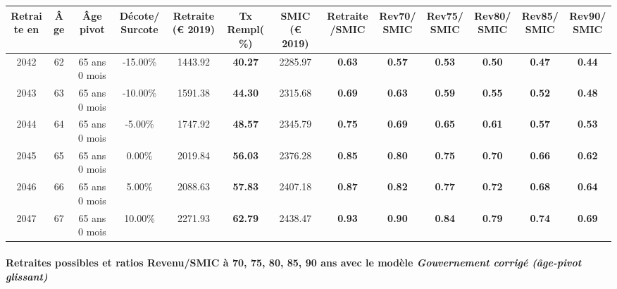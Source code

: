 { \scriptsize \begin{center} 
\begin{tabular}[htb]{|c|c||c|c||c|c||c||c|c|c|c|c|c|} 
\hline 
 Retraite en &  Âge &  Âge pivot &  Décote/Surcote &  Retraite (\euro{} 2019) &  Tx Rempl(\%) &  SMIC (\euro{} 2019) &  Retraite/SMIC &  Rev70/SMIC &  Rev75/SMIC &  Rev80/SMIC &  Rev85/SMIC &  Rev90/SMIC \\ 
\hline \hline 
 2042 &  62 &  65 ans 0 mois &  -15.00\% &  1443.92 &  {\bf 40.27} &  2285.97 &  {\bf {\color{red} 0.63}} &  {\bf {\color{red} 0.57}} &  {\bf {\color{red} 0.53}} &  {\bf {\color{red} 0.50}} &  {\bf {\color{red} 0.47}} &  {\bf {\color{red} 0.44}} \\ 
\hline 
 2043 &  63 &  65 ans 0 mois &  -10.00\% &  1591.38 &  {\bf 44.30} &  2315.68 &  {\bf {\color{red} 0.69}} &  {\bf {\color{red} 0.63}} &  {\bf {\color{red} 0.59}} &  {\bf {\color{red} 0.55}} &  {\bf {\color{red} 0.52}} &  {\bf {\color{red} 0.48}} \\ 
\hline 
 2044 &  64 &  65 ans 0 mois &  -5.00\% &  1747.92 &  {\bf 48.57} &  2345.79 &  {\bf {\color{red} 0.75}} &  {\bf {\color{red} 0.69}} &  {\bf {\color{red} 0.65}} &  {\bf {\color{red} 0.61}} &  {\bf {\color{red} 0.57}} &  {\bf {\color{red} 0.53}} \\ 
\hline 
 2045 &  65 &  65 ans 0 mois &  0.00\% &  2019.84 &  {\bf 56.03} &  2376.28 &  {\bf {\color{red} 0.85}} &  {\bf {\color{red} 0.80}} &  {\bf {\color{red} 0.75}} &  {\bf {\color{red} 0.70}} &  {\bf {\color{red} 0.66}} &  {\bf {\color{red} 0.62}} \\ 
\hline 
 2046 &  66 &  65 ans 0 mois &  5.00\% &  2088.63 &  {\bf 57.83} &  2407.18 &  {\bf {\color{red} 0.87}} &  {\bf {\color{red} 0.82}} &  {\bf {\color{red} 0.77}} &  {\bf {\color{red} 0.72}} &  {\bf {\color{red} 0.68}} &  {\bf {\color{red} 0.64}} \\ 
\hline 
 2047 &  67 &  65 ans 0 mois &  10.00\% &  2271.93 &  {\bf 62.79} &  2438.47 &  {\bf {\color{red} 0.93}} &  {\bf {\color{red} 0.90}} &  {\bf {\color{red} 0.84}} &  {\bf {\color{red} 0.79}} &  {\bf {\color{red} 0.74}} &  {\bf {\color{red} 0.69}} \\ 
\hline 
\hline 
\end{tabular} 
\end{center} } 
\paragraph{Retraites possibles et ratios Revenu/SMIC à 70, 75, 80, 85, 90 ans avec le modèle \emph{Gouvernement corrigé (âge-pivot glissant)}}  
 
